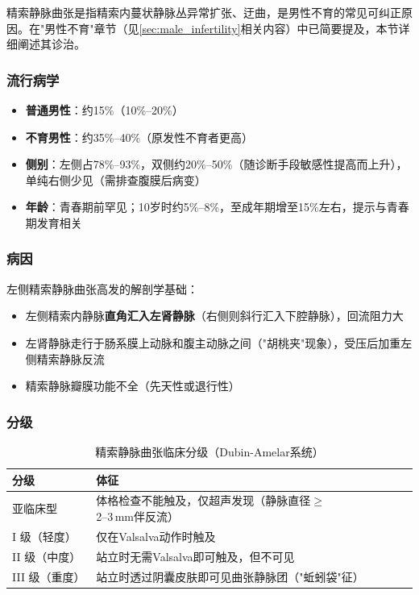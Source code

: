 精索静脉曲张是指精索内蔓状静脉丛异常扩张、迂曲，是男性不育的常见可纠正原因。在"男性不育"章节（见\ref{sec:male_infertility}相关内容）中已简要提及，本节详细阐述其诊治。

\subsubsection{流行病学}

\begin{itemize}[leftmargin=2cm]
	\item \textbf{普通男性}：约15\%（10\%--20\%）
	\item \textbf{不育男性}：约35\%--40\%（原发性不育者更高）
	\item \textbf{侧别}：左侧占78\%--93\%，双侧约20\%--50\%（随诊断手段敏感性提高而上升），单纯右侧少见（需排查腹膜后病变）
	\item \textbf{年龄}：青春期前罕见；10岁时约5\%--8\%，至成年期增至15\%左右，提示与青春期发育相关
\end{itemize}

\subsubsection{病因}

左侧精索静脉曲张高发的解剖学基础：
\begin{itemize}[leftmargin=2cm]
	\item 左侧精索内静脉\textbf{直角汇入左肾静脉}（右侧则斜行汇入下腔静脉），回流阻力大
	\item 左肾静脉走行于肠系膜上动脉和腹主动脉之间（"胡桃夹"现象），受压后加重左侧精索静脉反流
	\item 精索静脉瓣膜功能不全（先天性或退行性）
\end{itemize}

\subsubsection{分级}

\begin{table}[htbp]
\centering
\caption{精索静脉曲张临床分级（Dubin-Amelar系统）}
\label{tab:varicocele_grade}
\begin{tabularx}{\textwidth}{@{}lX@{}}
    \toprule
    \textbf{分级} & \textbf{体征} \\
    \midrule
    亚临床型 & 体格检查不能触及，仅超声发现（静脉直径$\ge$2--3\,mm伴反流） \\
    I 级（轻度） & 仅在Valsalva动作时触及 \\
    II 级（中度） & 站立时无需Valsalva即可触及，但不可见 \\
    III 级（重度） & 站立时透过阴囊皮肤即可见曲张静脉团（"蚯蚓袋"征） \\
    \bottomrule
\end{tabularx}
\end{table}

